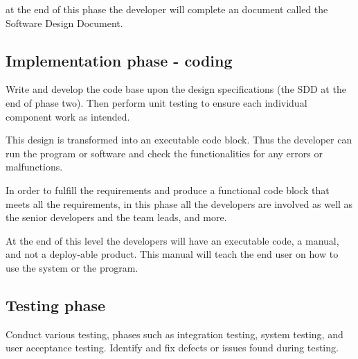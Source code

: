 \documentclass[a4paper]{article}
\begin{document}
at the end of this phase the developer will complete an document called the Software Design Document. 

\subsection{Implementation phase - coding}
 
Write and develop the code base upon the design specifications (the SDD at the end of phase two). Then perform unit testing to ensure each individual 
component work as intended. 
 
This design is transformed into an executable code block. Thus the developer can run the program or software and check the functionalities for any
errors or malfunctions.

In order to fulfill the requirements and produce a functional code block that meets all the requirements, in this phase all the developers are involved
as well as the senior developers and the team leads, and more.

At the end of this level the developers will have an executable code, a manual, and not a deploy-able product.  
This manual will teach the end user on how to use the system or the program. 


\subsection{Testing phase}

Conduct various testing, phases such as integration testing, system testing, and user acceptance testing. Identify and fix defects or issues found 
during testing.
\end{document}
